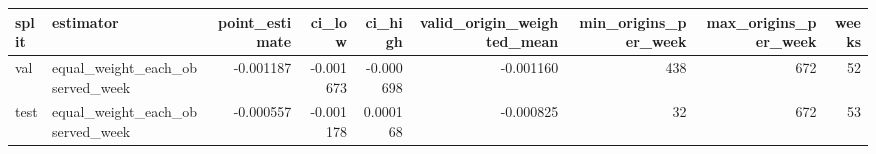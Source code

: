 \begin{tabular}{llrrrrrrr}
\toprule
split & estimator & point\_estimate & ci\_low & ci\_high & valid\_origin\_weighted\_mean & min\_origins\_per\_week & max\_origins\_per\_week & weeks \\
\midrule
val & equal\_weight\_each\_observed\_week & -0.001187 & -0.001673 & -0.000698 & -0.001160 & 438 & 672 & 52 \\
test & equal\_weight\_each\_observed\_week & -0.000557 & -0.001178 & 0.000168 & -0.000825 & 32 & 672 & 53 \\
\bottomrule
\end{tabular}
